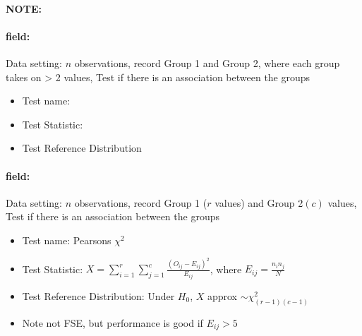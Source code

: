 \documentclass[12pt]{article}
\newenvironment{note}{\paragraph{NOTE:}}{}
\newenvironment{field}{\paragraph{field:}}{}
\begin{document}
\begin{note}
 \begin{field}
  Data setting: $n$ observations, record Group 1 and Group 2, where each group takes on > 2 values, Test if there is an association between the groups
  \begin{itemize}
   \item Test name:
   \item Test Statistic:
   \item Test Reference Distribution
  \end{itemize}
 \end{field}
 \begin{field}
  Data setting: $n$ observations, record Group 1 ($r$ values) and Group 2$(c)$ values, Test if there is an association between the groups
  \begin{itemize}
   \item Test name: Pearsons $\chi^2$
   \item Test Statistic: $X = \sum_{i=1}^r \sum_{j=1}^c \frac{(O_{ij} - E_{ij})^2}{E_{ij}}$, where $E_{ij} = \frac{n_in_j}{N}$
   \item Test Reference Distribution: Under $H_0$, $X$ approx $\sim \chi^2_{(r-1)(c-1)}$
   \item Note not FSE, but performance is good if $E_{ij} > 5$
  \end{itemize}
 \end{field}
\end{note}
\end{document}
